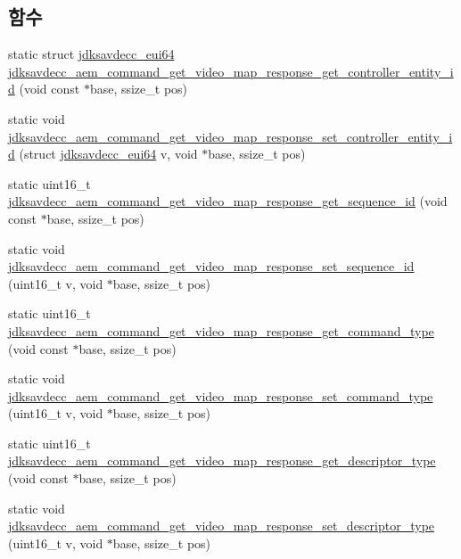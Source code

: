 \subsection*{함수}
\begin{DoxyCompactItemize}
\item 
static struct \hyperlink{structjdksavdecc__eui64}{jdksavdecc\+\_\+eui64} \hyperlink{group__command__get__video__map__response_ga91447acb77a610fbbb2e307cf1cb2e10}{jdksavdecc\+\_\+aem\+\_\+command\+\_\+get\+\_\+video\+\_\+map\+\_\+response\+\_\+get\+\_\+controller\+\_\+entity\+\_\+id} (void const $\ast$base, ssize\+\_\+t pos)
\item 
static void \hyperlink{group__command__get__video__map__response_gafa61f7d8424b673be90e49a779b6cc21}{jdksavdecc\+\_\+aem\+\_\+command\+\_\+get\+\_\+video\+\_\+map\+\_\+response\+\_\+set\+\_\+controller\+\_\+entity\+\_\+id} (struct \hyperlink{structjdksavdecc__eui64}{jdksavdecc\+\_\+eui64} v, void $\ast$base, ssize\+\_\+t pos)
\item 
static uint16\+\_\+t \hyperlink{group__command__get__video__map__response_ga2fee0b7448b39dff02681ccff95e4e9a}{jdksavdecc\+\_\+aem\+\_\+command\+\_\+get\+\_\+video\+\_\+map\+\_\+response\+\_\+get\+\_\+sequence\+\_\+id} (void const $\ast$base, ssize\+\_\+t pos)
\item 
static void \hyperlink{group__command__get__video__map__response_gad17d1da1fa627edd6294af7a7b0c3be7}{jdksavdecc\+\_\+aem\+\_\+command\+\_\+get\+\_\+video\+\_\+map\+\_\+response\+\_\+set\+\_\+sequence\+\_\+id} (uint16\+\_\+t v, void $\ast$base, ssize\+\_\+t pos)
\item 
static uint16\+\_\+t \hyperlink{group__command__get__video__map__response_gae07ce360681fbf503ff96272be3dd0e3}{jdksavdecc\+\_\+aem\+\_\+command\+\_\+get\+\_\+video\+\_\+map\+\_\+response\+\_\+get\+\_\+command\+\_\+type} (void const $\ast$base, ssize\+\_\+t pos)
\item 
static void \hyperlink{group__command__get__video__map__response_gaeff4f5c2304b63d1942962ca9bae6e1a}{jdksavdecc\+\_\+aem\+\_\+command\+\_\+get\+\_\+video\+\_\+map\+\_\+response\+\_\+set\+\_\+command\+\_\+type} (uint16\+\_\+t v, void $\ast$base, ssize\+\_\+t pos)
\item 
static uint16\+\_\+t \hyperlink{group__command__get__video__map__response_ga006c28cdab94f692cdf69e4b9d89bd76}{jdksavdecc\+\_\+aem\+\_\+command\+\_\+get\+\_\+video\+\_\+map\+\_\+response\+\_\+get\+\_\+descriptor\+\_\+type} (void const $\ast$base, ssize\+\_\+t pos)
\item 
static void \hyperlink{group__command__get__video__map__response_gac82dd514e3edbfa85e6167a35091975b}{jdksavdecc\+\_\+aem\+\_\+command\+\_\+get\+\_\+video\+\_\+map\+\_\+response\+\_\+set\+\_\+descriptor\+\_\+type} (uint16\+\_\+t v, void $\ast$base, ssize\+\_\+t pos)

\end{DoxyCompactItemize}
